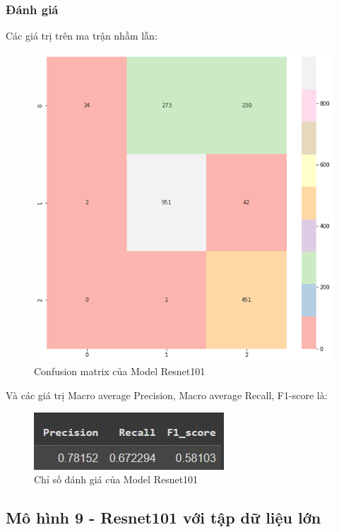 \subsubsection{Đánh giá}
Các giá trị trên ma trận nhầm lẫn:
\begin{center}
    \begin{figure}[!h]
        \centering
        \includegraphics[scale = 0.38]{fileanh/Resnet1.png}
        \caption{Confusion matrix của Model Resnet101}
    \end{figure}
\end{center}
Và các giá trị Macro average Precision, Macro average Recall, F1-score là:
\begin{center}
    \begin{figure}[!h]
        \centering
        \includegraphics[scale = 1.2]{fileanh/Resnet2.jpg}
        \caption{Chỉ số đánh giá của Model Resnet101}
    \end{figure}
\end{center}

\subsection{Mô hình 9 - Resnet101 với tập dữ liệu lớn}
